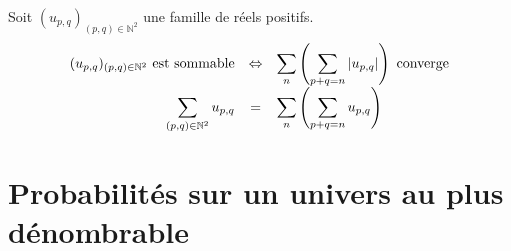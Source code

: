 \documentclass[11pt,a4paper,fleqn,pdftex]{report}
\begin{document}
\begin{itheorem}
     Soit $(u_{p,q})_{(p,q)\in \mathbb{N}^2}$ une famille de réels positifs.\newline
     \begin{equation}
          \begin{array}{r c l}
               (u_{p,q})_{(p,q)\in \mathbb{N}^2} \text{ est sommable} & \Leftrightarrow & \displaystyle\sum_n \left( \displaystyle\sum_{p+q = n} |u_{p,q}| \right)\text{ converge} \\
               \displaystyle\sum_{(p,q)\in \mathbb{N}^2} u_{p,q} & = & \displaystyle\sum_n \left( \displaystyle\sum_{p+q = n} u_{p,q} \right) \\
          \end{array}
     \end{equation}
\end{itheorem}
\chapter{Probabilités sur un univers au plus dénombrable} %
\label{cha:probabilites_sur_un_univers_au_plus_denombrable}
\end{document}
